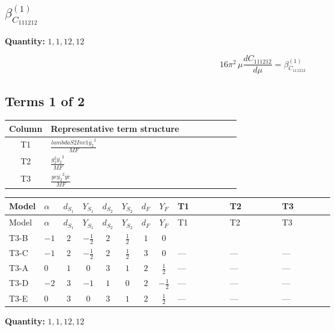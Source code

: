 \documentclass[8pt]{article}
\begin{document}
\begin{landscape}
\section*{$\beta_{C_{111212}}^{(1)}$}
\noindent\textbf{Quantity: }$\mathrm{1,1,12,12}$\par\smallskip
\[16\pi^2\,\mu\frac{d C_{111212}}{d\mu}=\beta_{C_{111212}}^{(1)}\]
\subsection*{Terms 1 of 2}
\begin{center}
\begin{tabular}{@{}c >{\raggedright\arraybackslash}p{0.82\linewidth}@{}}
\toprule
Column & Representative term structure \\
\midrule
T1 & \(\displaystyle \frac{lambdaS2Inv1 \overline{y_{2}}^{2}}{MF}\) \\
\midrule
T2 & \(\displaystyle \frac{g_{2}^{2} \overline{y_{2}}^{2}}{MF}\) \\
\midrule
T3 & \(\displaystyle \frac{ye \overline{y_{2}}^{2} \overline{ye}}{MF}\) \\
\midrule
\bottomrule
\end{tabular}
\end{center}
\smallskip
\tiny
\begin{longtable}{@{}llcccccc >{\raggedright\arraybackslash}p{0.21\linewidth} >{\raggedright\arraybackslash}p{0.21\linewidth} >{\raggedright\arraybackslash}p{0.21\linewidth}@{}}
\toprule
Model & $\alpha$ & $d_{S_1}$ & $Y_{S_1}$ & $d_{S_2}$ & $Y_{S_2}$ & $d_F$ & $Y_F$ & T1 & T2 & T3 \\
\midrule
\endfirsthead
\toprule
Model & $\alpha$ & $d_{S_1}$ & $Y_{S_1}$ & $d_{S_2}$ & $Y_{S_2}$ & $d_F$ & $Y_F$ & T1 & T2 & T3 \\
\midrule
\endhead
T3-B & $-1$ & $2$ & $-\frac{1}{2}$ & $2$ & $\frac{1}{2}$ & $1$ & $0$ & \scriptsize\adjustbox{max width=\linewidth}{$\begin{gathered} \frac{lambdaS2Inv1 \overline{y_{2}}^{2}}{2 MF}\end{gathered}$} & \scriptsize\adjustbox{max width=\linewidth}{$\begin{gathered} \frac{3 g_{2}^{2} \overline{y_{2}}^{2}}{4 MF}\end{gathered}$} & \scriptsize\adjustbox{max width=\linewidth}{$\begin{gathered} - \frac{ye \overline{y_{2}}^{2} \overline{ye}}{4 MF}\end{gathered}$} \\
\midrule
T3-C & $-1$ & $2$ & $-\frac{1}{2}$ & $2$ & $\frac{1}{2}$ & $3$ & $0$ & --- & --- & --- \\
\midrule
T3-A & $0$ & $1$ & $0$ & $3$ & $1$ & $2$ & $\frac{1}{2}$ & --- & --- & --- \\
\midrule
T3-D & $-2$ & $3$ & $-1$ & $1$ & $0$ & $2$ & $-\frac{1}{2}$ & --- & --- & --- \\
\midrule
T3-E & $0$ & $3$ & $0$ & $3$ & $1$ & $2$ & $\frac{1}{2}$ & --- & --- & --- \\
\midrule
\bottomrule
\end{longtable}
\clearpage
\noindent\textbf{Quantity: }$\mathrm{1,1,12,12}$\par\smallskip

\end{landscape}
\end{document}
